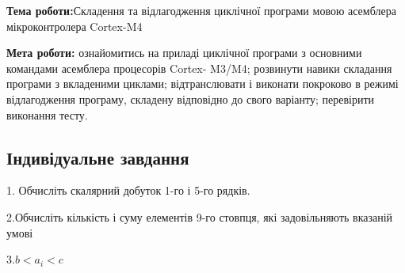 \documentclass[12pt]{extarticle}
\begin{document}
\textbf{Тема роботи:}Складення та відлагодження циклічної програми мовою асемблера
мікроконтролера Cortex-M4

\vspace{12pt}

\textbf{Мета роботи:} ознайомитись на приладі циклічної програми з основними
командами асемблера процесорів Cortex- M3/M4; розвинути
навики складання програми з вкладеними циклами;
відтранслювати і виконати покроково в режимі
відлагодження програму, складену відповідно до свого
варіанту; перевірити виконання тесту.

\subsection*{Індивідуальне завдання}

1. Обчисліть скалярний добуток 1-го і 5-го рядків.

2.Обчисліть кількість і суму елементів 9-го стовпця, які
задовільняють вказаній умові

3.$b < a_i < c$
\end{document}

